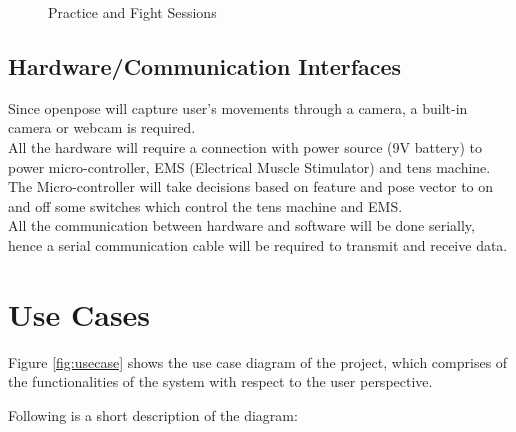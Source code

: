 \begin{figure}
{  }
  \quad 
  \caption{Practice and Fight Sessions} 
  \centering
  \label{fig:practiceFight}
\end{figure}


\subsection{Hardware/Communication Interfaces}
Since openpose will capture user's movements through a camera, a built-in camera or webcam is required. 
\\
All the hardware will require a connection with power source (9V battery) to power micro-controller, EMS (Electrical Muscle Stimulator) and tens machine.
\\
The Micro-controller will take decisions based on feature and pose vector to on and off some switches which control the tens machine and EMS.
\\
All the communication between hardware and software will be done serially, hence a serial communication cable will be required to transmit and receive data. 

\section{Use Cases}

Figure \ref{fig:usecase} shows the use case diagram of the project, which comprises of the functionalities of the system with respect to the user perspective. 


Following is a short description of the diagram: 


